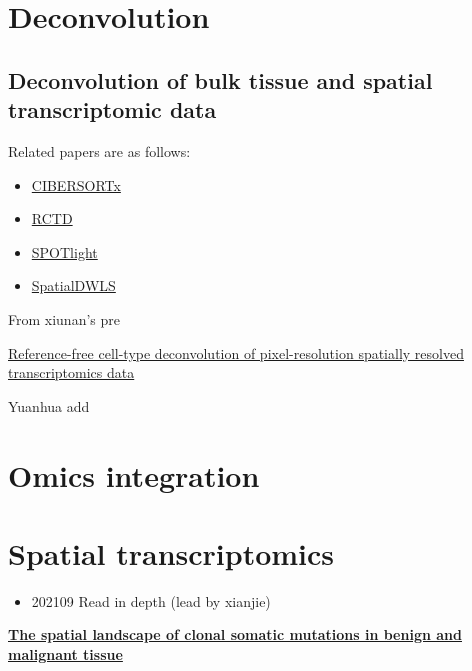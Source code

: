\documentclass[
]{book}
\providecommand{\tightlist}{%
  \setlength{\itemsep}{0pt}\setlength{\parskip}{0pt}}
\begin{document}
\hypertarget{deconvolution}{%
\section{Deconvolution}\label{deconvolution}}

\hypertarget{deconvolution-of-bulk-tissue-and-spatial-transcriptomic-data}{%
\subsection{Deconvolution of bulk tissue and spatial transcriptomic data}\label{deconvolution-of-bulk-tissue-and-spatial-transcriptomic-data}}

Related papers are as follows:

\begin{itemize}
\tightlist
\item
  \href{https://www.nature.com/articles/s41587-019-0114-2}{CIBERSORTx}
\item
  \href{https://www.nature.com/articles/s41587-021-00830-w}{RCTD}
\item
  \href{https://academic.oup.com/nar/article/49/9/e50/6129341}{SPOTlight}
\item
  \href{https://genomebiology.biomedcentral.com/articles/10.1186/s13059-021-02362-7}{SpatialDWLS}
\end{itemize}

From xiunan's pre

\href{https://www.biorxiv.org/content/10.1101/2021.06.15.448381v1}{Reference-free cell-type deconvolution of pixel-resolution spatially resolved transcriptomics data}

Yuanhua add

\hypertarget{omics-integration}{%
\section{Omics integration}\label{omics-integration}}

\hypertarget{spatial-transcriptomics}{%
\section{Spatial transcriptomics}\label{spatial-transcriptomics}}

\begin{itemize}
\tightlist
\item
  202109 Read in depth (lead by xianjie)
\end{itemize}

\textbf{\href{https://www.biorxiv.org/content/10.1101/2021.07.12.452018v1.full}{The spatial landscape of clonal somatic mutations in benign and malignant tissue}\citep{erickson2021spatial}}
\end{document}
